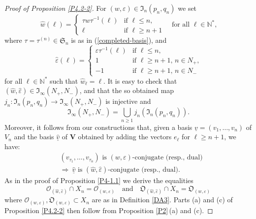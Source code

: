 \documentclass{amsart}
\theoremstyle{definition}
\newcommand{\bs}[1]{\boldsymbol{#1}}
\begin{document}
\begin{proof}[Proof of Proposition \ref{P4.2-2}]
For $(w,\varepsilon)\in\mathfrak{I}_n(p_n,q_n)$
we set
\begin{equation}
\label{4.5.4}
\hat{w}(\ell)=\left\{
\begin{array}{ll}
\tau w\tau^{-1}(\ell) & \mbox{if $\ell\leq n$,} \\
\ell & \mbox{if $\ell\geq n+1$}
\end{array}
\right.\quad\mbox{for all $\ell\in\mathbb{N}^*$,}
\end{equation}
where $\tau=\tau^{(n)}\in\mathfrak{S}_n$ is as in (\ref{completed-basis}), and
\begin{equation}
\label{4.5.5}\hat{\varepsilon}(\ell)=\left\{
\begin{array}{ll}
\varepsilon\tau^{-1}(\ell) & \mbox{if $\ell\leq n$,} \\
1 & \mbox{if $\ell\geq n+1$, $n\in N_+$,} \\
-1 & \mbox{if $\ell\geq n+1$, $n\in N_-$}
\end{array}
\right.
\end{equation}
for all $\ell\in\mathbb{N}^*$ such that $\hat{w}_\ell=\ell$.
It is easy to check that $(\hat{w},\hat{\varepsilon})\in\mathfrak{I}_\infty(N_+,N_-)$,
and that the so obtained map $j_n:\mathfrak{I}_n(p_n,q_n)\to\mathfrak{I}_\infty(N_+,N_-)$ is injective
and 
\[
\mathfrak{I}_\infty(N_+,N_-)=\bigcup_{n\geq 1}j_n(\mathfrak{I}_n(p_n,q_n)).
\]
Moreover, it follows from our constructions that, given a basis $\underline{v}=(v_1,\ldots,v_n)$ of $V_n$ and the basis $\underline{\hat{v}}$ of $\mathbf{V}$ obtained by adding the vectors $e_\ell$ for $\ell\geq n+1$, we have:
\begin{eqnarray*}
 & \mbox{$(v_{\tau_1},\ldots,v_{\tau_n})$ is $(w,\varepsilon)$-conjugate (resp., dual)} \\
 & \Rightarrow \
\mbox{$\underline{\hat{v}}$ is $(\hat{w},\hat{\varepsilon})$-conjugate (resp., dual)}.
\end{eqnarray*}
As in the proof of Proposition \ref{P4-1.1} we derive the equalities
\begin{equation}
\label{T-proof.2}
\bs{\mathcal{O}}_{(\hat{w},\hat{\varepsilon})}\cap X_{n}=\mathcal{O}_{(w,\varepsilon)}
\quad
\mbox{and}
\quad
\bs{\mathfrak{O}}_{(\hat{w},\hat{\varepsilon})}\cap X_{n}=\mathfrak{O}_{(w,\varepsilon)}
\end{equation}
where $\mathcal{O}_{(w,\varepsilon)},\mathfrak{O}_{(w,\varepsilon)}\subset X_{n}$ are as in Definition \ref{DA3}.
Parts {\rm (a)} and {\rm (c)} of Proposition \ref{P4.2-2} then follow
from Proposition \ref{P2}\,{\rm (a)} and {\rm (c)}.
\end{proof}
\end{document}
